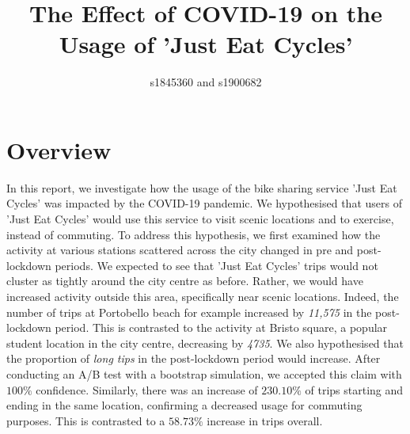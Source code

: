 \documentclass[11pt,a4paper]{article}
\title{%
 The Effect of COVID-19 on the Usage of 'Just Eat Cycles'}
\author{s1845360 and s1900682\vspace{-6em}}
\date{}
\begin{document}
\maketitle


\section{Overview} In this report, we investigate how the usage of the bike sharing service 'Just Eat Cycles' was impacted by the COVID-19 pandemic. We hypothesised that users of 'Just Eat Cycles' would use this service to visit scenic locations and to exercise, instead of commuting. To address this hypothesis, we first examined how the activity at various stations scattered across the city changed in pre and post-lockdown periods. We expected to see that 'Just Eat Cycles' trips would not cluster as tightly around the city centre as before. Rather, we would have increased activity outside this area, specifically near scenic locations. Indeed, the number of trips at Portobello beach for example increased by \emph{11,575} in the post-lockdown period. This is contrasted to the activity at Bristo square, a popular student location in the city centre, decreasing by \emph{4735}. We also hypothesised that the proportion of \emph{long tips} in the post-lockdown period would increase. After conducting an A/B test with a bootstrap simulation, we accepted this claim with $100\%$ confidence. Similarly, there was an increase of $230.10\%$ of trips starting and ending in the same location, confirming a decreased usage for commuting purposes. This is contrasted to a $58.73\%$ increase in trips overall.
\end{document}
